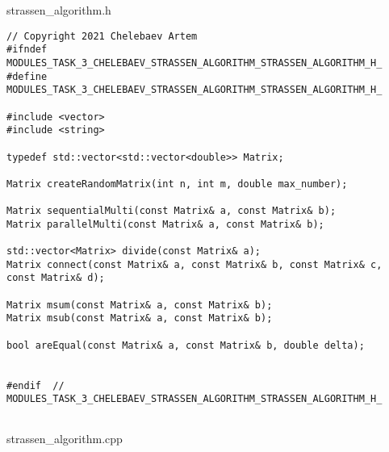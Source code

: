 \documentclass{report}
\begin{document}
strassen\_algorithm.h
\begin{lstlisting}
// Copyright 2021 Chelebaev Artem
#ifndef MODULES_TASK_3_CHELEBAEV_STRASSEN_ALGORITHM_STRASSEN_ALGORITHM_H_
#define MODULES_TASK_3_CHELEBAEV_STRASSEN_ALGORITHM_STRASSEN_ALGORITHM_H_

#include <vector>
#include <string>

typedef std::vector<std::vector<double>> Matrix;

Matrix createRandomMatrix(int n, int m, double max_number);

Matrix sequentialMulti(const Matrix& a, const Matrix& b);
Matrix parallelMulti(const Matrix& a, const Matrix& b);

std::vector<Matrix> divide(const Matrix& a);
Matrix connect(const Matrix& a, const Matrix& b, const Matrix& c, const Matrix& d);

Matrix msum(const Matrix& a, const Matrix& b);
Matrix msub(const Matrix& a, const Matrix& b);

bool areEqual(const Matrix& a, const Matrix& b, double delta);


#endif  // MODULES_TASK_3_CHELEBAEV_STRASSEN_ALGORITHM_STRASSEN_ALGORITHM_H_


\end{lstlisting}
strassen\_algorithm.cpp
\end{document}
